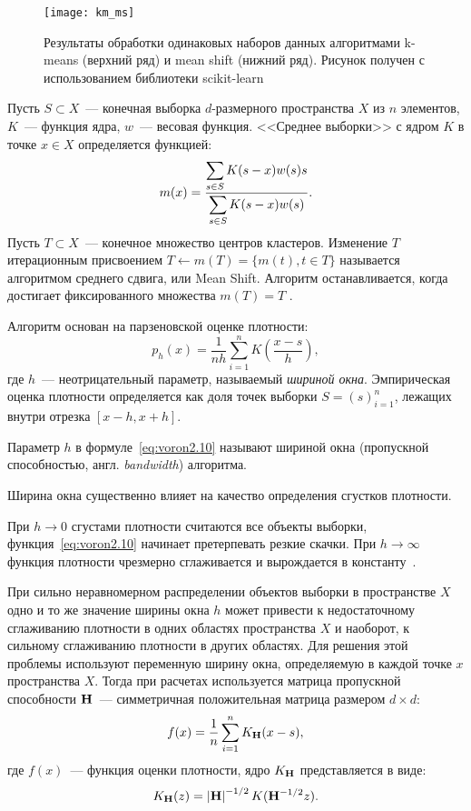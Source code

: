 \begin{figure}[h!]
    \centering
    \texttt{[image: km\_ms]}\\[1ex]
    \parbox{.9\textwidth}{\caption{Результаты обработки одинаковых наборов данных алгоритмами k-means (верхний ряд) и mean shift (нижний ряд). Рисунок получен с использованием библиотеки scikit-learn~\cite{sklearn}} \label{pic:km-ms}}
\end{figure}

Пусть \( S\subset X \)~--- конечная выборка \( d \)-размерного пространства \( X \) из \( n \) элементов, \( K \)~--- функция ядра, \( w \)~--- весовая функция. <<Среднее выборки>> с ядром \( K \) в точке \( x\in X \) определяется функцией:
\begin{equation}
    m(x) = \frac{\displaystyle\sum_{s\in S} K(s - x)w(s)s}{\displaystyle\sum_{s\in S} K(s - x)w(s)}.
    \label{eq:wiki-shift}
\end{equation}
Пусть \( T\subset X \)~--- конечное множество центров кластеров. Изменение \( T \) итерационным присвоением \( T\gets m(T) = \Big\{ m(t), t\in T\Big\} \) называется алгоритмом среднего сдвига, или Mean Shift. Алгоритм останавливается, когда достигает фиксированного множества \( m(T) = T \) \cite{meanshift}.

Алгоритм основан на парзеновской оценке плотности:
\begin{equation}
    p_h(x) = \frac{1}{nh}\sum_{i=1}^n K\left(\frac{x - s}{h}\right),
    \label{eq:voron2.10}
\end{equation}
где \( h \)~--- неотрицательный параметр, называемый \emph{шириной окна}. Эмпирическая оценка плотности определяется как доля точек выборки \( S = (s)_{i=1}^n \), лежащих внутри отрезка \( [x - h, x + h] \).

Параметр \( h \) в формуле~\eqref{eq:voron2.10} называют шириной окна (пропускной способностью, англ. \emph{bandwidth}) алгоритма.

Ширина окна существенно влияет на качество определения сгустков плотности.

При \( h\to 0 \) сгустами плотности считаются все объекты выборки, функция~\eqref{eq:voron2.10} начинает претерпевать резкие скачки. При \( h\to\infty \) функция плотности чрезмерно сглаживается и вырождается в константу~\cite{voron}.

При сильно неравномерном распределении объектов выборки в пространстве \( X \) одно и то же значение ширины окна \( h \) может привести к недостаточному сглаживанию плотности в одних областях пространства \( X \) и наоборот, к сильному сглаживанию плотности в других областях. Для решения этой проблемы используют переменную ширину окна, определяемую в каждой точке \( x \) пространства \( X \). Тогда при расчетах используется матрица пропускной способности \( \mathbf{H} \)~--- симметричная положительная матрица размером \( d\times d\):
\begin{equation}
    f(x) = \frac{1}{n}\sum_{i=1}^n K_{\mathbf{H}}(x - s),
    \label{eq:msrobust1}
\end{equation}
где \( f(x) \)~--- функция оценки плотности, ядро \( K_{\mathbf{H}} \) представляется в виде:
\[
    K_{\mathbf{H}}(z) = \left|\mathbf{H}\right|^{-1/2} K(\mathbf{H}^{-1/2}z).
\]

